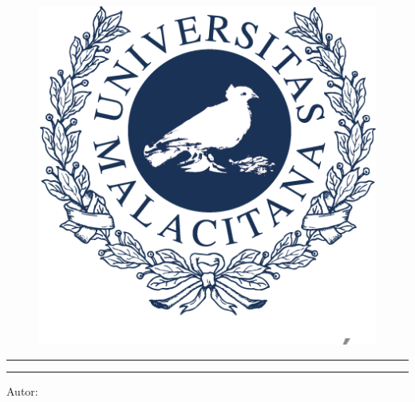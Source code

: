 \begin{titlepage}
  \centering
  \begin{figure}
    \centering
    \includegraphics[scale=0.2]{images/LogoUMA.png}
  \end{figure}
  {\bfseries\LARGE \universidad \par}
  \vspace{1cm}
  {\scshape\Large \grado \par}
  \vspace{3cm}
  \hrule
  \vspace{0.5cm}
  {\scshape\Huge \asignatura \par}
  {\itshape\Large \titulo \par}
  \vspace{0.5cm}
  \hrule
  \vfill
  {\Large Autor: \par}
  {\Large \autor \par}
  \vfill
  {\Large \fecha \par}
\end{titlepage} 
